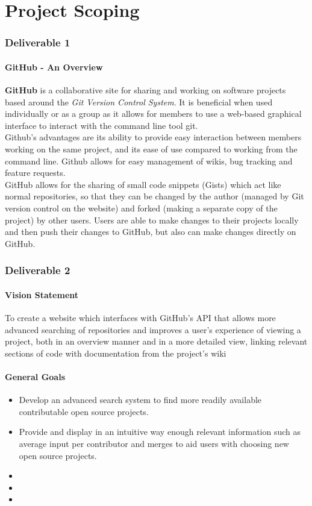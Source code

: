 \documentclass[12pt]{article}
\begin{document}
\part{Project Scoping}
\setcounter{section}{1}
\setcounter{subsection}{0}
\section*{Deliverable 1}
\subsection{GitHub - An Overview}
\textbf{GitHub} is a collaborative site for sharing and working on software projects based around the \textit{Git Version Control System}. It is beneficial when used individually or as a group as it allows for members to use a web-based graphical interface to interact with the command line tool git.\\ 

\noindent Github's advantages are its ability to provide easy interaction between members working on the same project, and its ease of use compared to working from the command line. Github allows for easy management of wikis, bug tracking and feature requests.\\

\noindent GitHub allows for the sharing of small code snippets (Gists) which act like normal repositories, so that they can be changed by the author (managed by Git version control on the website) and forked (making a separate copy of the project) by other users. Users are able to make changes to their projects locally and then push their changes to GitHub, but also can make changes directly on GitHub.

\setcounter{section}{2}
\setcounter{subsection}{0}
\section*{Deliverable 2}
\subsection{Vision Statement}
To create a website which interfaces with GitHub's API that allows more advanced searching of repositories and improves a user's experience of viewing a project, both in an overview manner and in a more detailed view, linking relevant sections of code with documentation from the project's wiki
\subsection{General Goals}
\begin{itemize}
\item Develop an advanced search system to find more readily available contributable open source projects.
\item Provide and display in an intuitive way enough relevant information such as average input per contributor and merges to aid users with choosing new open source projects.
\item 
\item
\item
\end{itemize}
\end{document}
